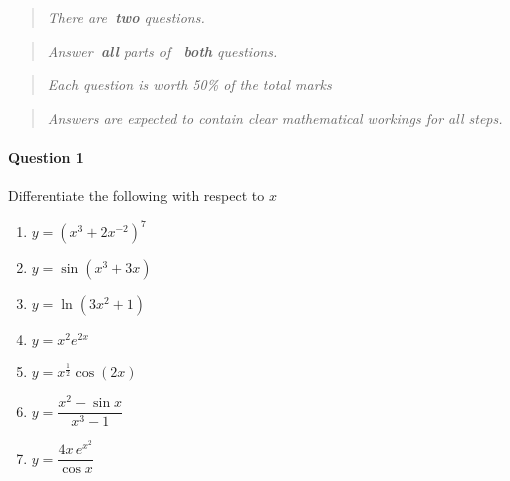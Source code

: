 \documentclass[a4paper,12pt,fleqn]{article}
\begin{document}

\newpage

\begin{quote}
\begin{center}
\textit{There are\textbf{\ two} questions.}
\end{center}
\end{quote}

\begin{quote}
\begin{center}
\textit{Answer\textbf{\ all} parts of \textbf{\ both} questions.}
\end{center}
\end{quote}

\begin{quote}
\begin{center}
\textit{Each question is worth 50\% of the total marks}
\end{center}
\end{quote}

\begin{quote}
\begin{center}
\textit{Answers are expected to contain clear mathematical workings for all steps.}
\end{center}
\end{quote}

\bigskip

\newpage
\paragraph{\textbf{Question 1}}

Differentiate the following with respect to $x$

\begin{enumerate}[label=\alph*)]
\item $y=\left(x^3+2x^{-2}\right)^7$
\newline
\item $y=\sin\left(x^3+3x\right)$
\newline
\item $y=\ln\left(3x^2+1\right)$
\newline
\item $y=x^2e^{2x}$
\newline
\item $y=x^{\frac{1}{2}}\cos\left(2x\right)$
\newline
\item $y=\dfrac{x^2-\sin x}{x^3-1}$
\newline
\item $y=\dfrac{4x\,e^{x^2}}{\cos x}$
\end{enumerate}
\end{document}
